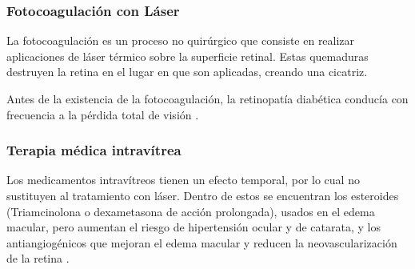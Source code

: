 

\subsubsection{Fotocoagulación  con Láser}
La fotocoagulación es un proceso no quirúrgico que consiste en realizar aplicaciones de láser térmico sobre la superficie retinal. Estas quemaduras destruyen la retina en el lugar en que son aplicadas, creando una cicatriz. 

 Antes de la existencia de la fotocoagulación, la retinopatía diabética conducía con frecuencia a la pérdida total de visión \cite{kanski2004oftalmologia}.
 
 \subsubsection{Terapia médica intravítrea}
 Los medicamentos intravítreos tienen un efecto temporal, por lo cual no sustituyen al tratamiento con láser. Dentro de estos se encuentran los esteroides (Triamcinolona o dexametasona de acción prolongada), usados en el edema macular, pero aumentan el riesgo de hipertensión ocular y de catarata, y los antiangiogénicos que mejoran el edema macular y reducen la neovascularización de la retina \cite{barria2011guia}.
